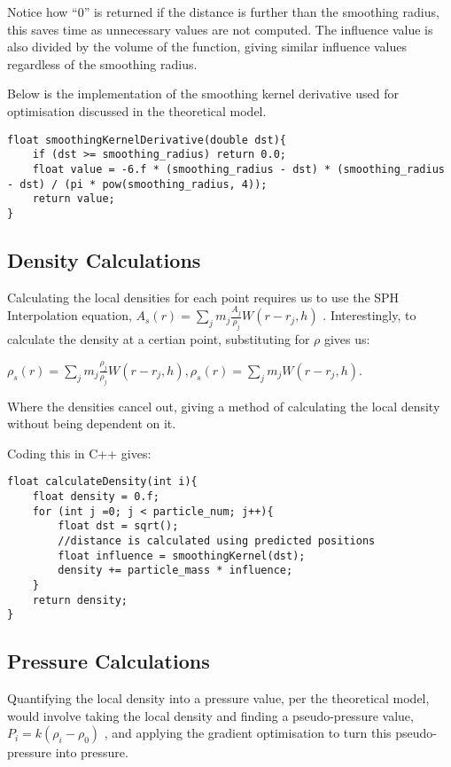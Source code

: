 \documentclass[write-up.tex]{subfiles}
\begin{document}
Notice how ``0'' is returned if the distance is further than the smoothing radius, this saves time as unnecessary values are not computed. The influence value is also divided by the volume of the function, giving similar influence values regardless of the smoothing radius.

Below is the implementation of the smoothing kernel derivative used for optimisation discussed in the theoretical model.

\begin{lstlisting}
float smoothingKernelDerivative(double dst){
    if (dst >= smoothing_radius) return 0.0;
    float value = -6.f * (smoothing_radius - dst) * (smoothing_radius - dst) / (pi * pow(smoothing_radius, 4));
    return value;
}
\end{lstlisting}

\subsection{Density Calculations}
Calculating the local densities for each point requires us to use the SPH Interpolation equation, $A_s(r) = \sum_{j} m_j \frac{A_j}{\rho_j}W(r-r_j, h)$ \cite{muller}. Interestingly, to calculate the density at a certian point, substituting for $\rho$ gives us:

\begin{center}
 $ \rho_s(r) = \sum_{j} m_j \frac{\rho_j}{\rho_j}W(r-r_j, h),
 \rho_s(r) = \sum_{j} m_j W(r-r_j, h).$
\end{center}
 Where the densities cancel out, giving a method of calculating the local density without being dependent on it.

Coding this in C++ gives:
\begin{lstlisting}
float calculateDensity(int i){
    float density = 0.f;
    for (int j =0; j < particle_num; j++){
        float dst = sqrt();
        //distance is calculated using predicted positions
        float influence = smoothingKernel(dst);
        density += particle_mass * influence;
    }
    return density;
}
\end{lstlisting}

\subsection{Pressure Calculations}
Quantifying the local density into a pressure value, per the theoretical model, would involve taking the local density and finding a pseudo-pressure value, $P_i = k(\rho_i - \rho_0)$ \cite{clavet}, and applying the gradient optimisation to turn this pseudo-pressure into pressure.
\end{document}
